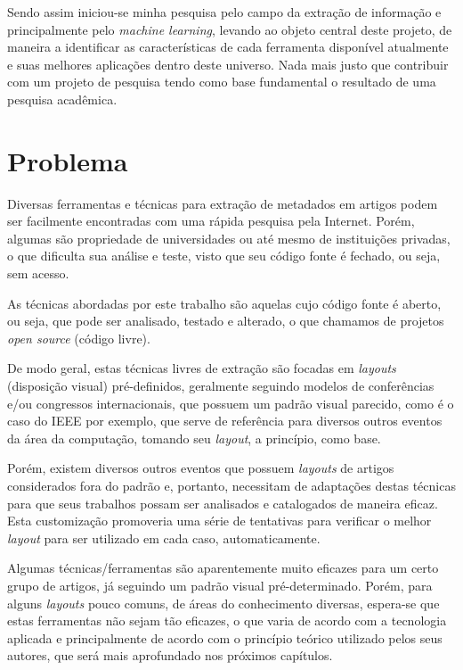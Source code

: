 Sendo assim iniciou-se minha pesquisa pelo campo da extração de informação e principalmente pelo \textit{machine learning}, levando ao objeto central deste projeto, de maneira a identificar as características de cada ferramenta disponível atualmente e suas melhores aplicações dentro deste universo. Nada mais justo que contribuir com um projeto de pesquisa tendo como base fundamental o resultado de uma pesquisa acadêmica.

\section{Problema}
\label{sec:problem}

Diversas ferramentas e técnicas para extração de metadados em artigos podem ser facilmente encontradas com uma rápida pesquisa pela Internet. Porém, algumas são propriedade de universidades ou até mesmo de instituições privadas, o que dificulta sua análise e teste, visto que seu código fonte é fechado, ou seja, sem acesso.

As técnicas abordadas por este trabalho são aquelas cujo código fonte é aberto, ou seja, que pode ser analisado, testado e alterado, o que chamamos de projetos \textit{open source} (código livre).

De modo geral, estas técnicas livres de extração são focadas em \textit{layouts} (disposição visual) pré-definidos, geralmente seguindo modelos de conferências e/ou congressos internacionais, que possuem um padrão visual parecido, como é o caso do IEEE por exemplo, que serve de referência para diversos outros eventos da área da computação, tomando seu \textit{layout}, a princípio, como base.

Porém, existem diversos outros eventos que possuem \textit{layouts} de artigos considerados fora do padrão e, portanto, necessitam de adaptações destas técnicas para que seus trabalhos possam ser analisados e catalogados de maneira eficaz. Esta customização promoveria uma série de tentativas para verificar o melhor \textit{layout} para ser utilizado em cada caso, automaticamente.

Algumas técnicas/ferramentas são aparentemente muito eficazes para um certo grupo de artigos, já seguindo um padrão visual pré-determinado. Porém, para alguns \textit{layouts} pouco comuns, de áreas do conhecimento diversas, espera-se que estas ferramentas não sejam tão eficazes, o que varia de acordo com a tecnologia aplicada e principalmente de acordo com o princípio teórico utilizado pelos seus autores, que será mais aprofundado nos próximos capítulos.

